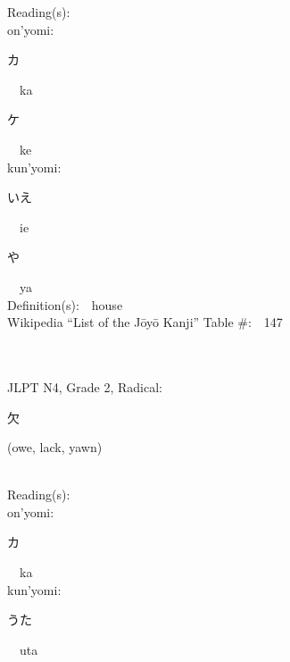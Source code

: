 \begin{multicols}{2}
Reading(s):\ \ \\
{\hspace*{1em}}on'yomi:\ \ \\
{\hspace*{2em}}{\begin{CJK}{UTF8}{min} カ \end{CJK}}\ \ ka\ \ \\
{\hspace*{2em}}{\begin{CJK}{UTF8}{min} ケ \end{CJK}}\ \ ke\ \ \\
{\hspace*{1em}}kun'yomi:\ \ \\
{\hspace*{2em}}{\begin{CJK}{UTF8}{min} いえ \end{CJK}}\ \ ie\ \ \\
{\hspace*{2em}}{\begin{CJK}{UTF8}{min} や \end{CJK}}\ \ ya\ \ \\
Definition(s):\ \ house \\
Wikipedia ``List of the J\=oy\=o Kanji'' Table \#:\ \ 147 \\
\ \ \\
{\fontsize{34pt}{40pt}  }\ \ \\  %
{JLPT N4, Grade 2, Radical:\ \ {\begin{CJK}{UTF8}{min} 欠 \end{CJK}} (owe, lack, yawn) } \\
Reading(s):\ \ \\
{\hspace*{1em}}on'yomi:\ \ \\
{\hspace*{2em}}{\begin{CJK}{UTF8}{min} カ \end{CJK}}\ \ ka\ \ \\
{\hspace*{1em}}kun'yomi:\ \ \\
{\hspace*{2em}}{\begin{CJK}{UTF8}{min} うた \end{CJK}}\ \ uta\ \ \\

\end{multicols}
